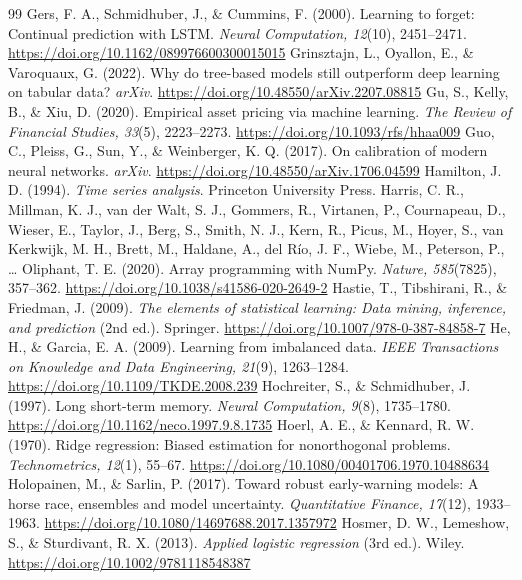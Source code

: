 \begin{thebibliography}{99}
 Gers, F. A., Schmidhuber, J., \& Cummins, F. (2000). Learning to forget: Continual prediction with LSTM. \textit{Neural Computation, 12}(10), 2451--2471. \url{https://doi.org/10.1162/089976600300015015}
 Grinsztajn, L., Oyallon, E., \& Varoquaux, G. (2022). Why do tree-based models still outperform deep learning on tabular data? \textit{arXiv}. \url{https://doi.org/10.48550/arXiv.2207.08815}
 Gu, S., Kelly, B., \& Xiu, D. (2020). Empirical asset pricing via machine learning. \textit{The Review of Financial Studies, 33}(5), 2223--2273. \url{https://doi.org/10.1093/rfs/hhaa009}
 Guo, C., Pleiss, G., Sun, Y., \& Weinberger, K. Q. (2017). On calibration of modern neural networks. \textit{arXiv}. \url{https://doi.org/10.48550/arXiv.1706.04599}
 Hamilton, J. D. (1994). \textit{Time series analysis}. Princeton University Press.%
 Harris, C. R., Millman, K. J., van der Walt, S. J., Gommers, R., Virtanen, P., Cournapeau, D., Wieser, E., Taylor, J., Berg, S., Smith, N. J., Kern, R., Picus, M., Hoyer, S., van Kerkwijk, M. H., Brett, M., Haldane, A., del Río, J. F., Wiebe, M., Peterson, P., \ldots{} Oliphant, T. E. (2020). Array programming with NumPy. \textit{Nature, 585}(7825), 357--362. \url{https://doi.org/10.1038/s41586-020-2649-2}
 Hastie, T., Tibshirani, R., \& Friedman, J. (2009). \textit{The elements of statistical learning: Data mining, inference, and prediction} (2nd ed.). Springer. \url{https://doi.org/10.1007/978-0-387-84858-7}
 He, H., \& Garcia, E. A. (2009). Learning from imbalanced data. \textit{IEEE Transactions on Knowledge and Data Engineering, 21}(9), 1263--1284. \url{https://doi.org/10.1109/TKDE.2008.239}
 Hochreiter, S., \& Schmidhuber, J. (1997). Long short-term memory. \textit{Neural Computation, 9}(8), 1735--1780. \url{https://doi.org/10.1162/neco.1997.9.8.1735}
 Hoerl, A. E., \& Kennard, R. W. (1970). Ridge regression: Biased estimation for nonorthogonal problems. \textit{Technometrics, 12}(1), 55--67. \url{https://doi.org/10.1080/00401706.1970.10488634}
 Holopainen, M., \& Sarlin, P. (2017). Toward robust early-warning models: A horse race, ensembles and model uncertainty. \textit{Quantitative Finance, 17}(12), 1933--1963. \url{https://doi.org/10.1080/14697688.2017.1357972}
 Hosmer, D. W., Lemeshow, S., \& Sturdivant, R. X. (2013). \textit{Applied logistic regression} (3rd ed.). Wiley. \url{https://doi.org/10.1002/9781118548387}

\end{thebibliography}
